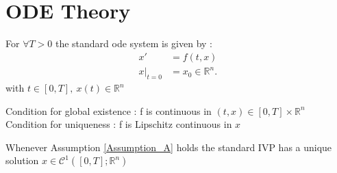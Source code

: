 \section{ODE Theory}
\begin{definition}
 For $\forall  T > 0 $  the standard ode system is given by : 
 \begin{align*}
  x' &= f(t,x) \\
  x \vert_{t=0} &=  x_0 \in \mathbb{R}^{n} 
 .\end{align*}
 with $t \in  [0,T] ,\ x(t) \in  \mathbb{R}^{n} $
\end{definition}
\begin{assumption}\label{Assumption_A}
  Condition for global existence : f is continuous in $(t,x) \in  [0,T] \times \mathbb{R}^{n} $ \\ 
  Condition for uniqueness : f is Lipschitz continuous in $x$  
\end{assumption}
\begin{theorem}\label{picard1}
  Whenever Assumption \ref{Assumption_A} holds the standard IVP has a unique solution $x \in  \mathcal{C}^{1}([0,T] ; \mathbb{R}^{n} ) $
\end{theorem}
